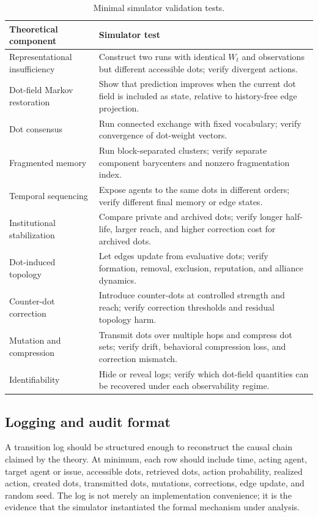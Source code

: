 \documentclass[11pt]{article}
\theoremstyle{remark}
\begin{document}
\begin{longtable}{L{0.31\textwidth}L{0.57\textwidth}}
\caption{Minimal simulator validation tests.}\label{tab:simulator-theorem-tests}\\
\toprule
Theoretical component & Simulator test \\
\midrule
Representational insufficiency & Construct two runs with identical
$W_t$ and observations but different accessible dots; verify divergent
actions. \\
Dot-field Markov restoration & Show that prediction improves when the
current dot field is included as state, relative to history-free edge
projection. \\
Dot consensus & Run connected exchange with fixed vocabulary; verify
convergence of dot-weight vectors. \\
Fragmented memory & Run block-separated clusters; verify separate
component barycenters and nonzero fragmentation index. \\
Temporal sequencing & Expose agents to the same dots in different
orders; verify different final memory or edge states. \\
Institutional stabilization & Compare private and archived dots; verify
longer half-life, larger reach, and higher correction cost for archived
dots. \\
Dot-induced topology & Let edges update from evaluative dots; verify
formation, removal, exclusion, reputation, and alliance dynamics. \\
Counter-dot correction & Introduce counter-dots at controlled strength
and reach; verify correction thresholds and residual topology harm. \\
Mutation and compression & Transmit dots over multiple hops and compress
dot sets; verify drift, behavioral compression loss, and correction
mismatch. \\
Identifiability & Hide or reveal logs; verify which dot-field quantities
can be recovered under each observability regime. \\
\bottomrule
\end{longtable}

\subsection{Logging and audit format}\label{logging-and-audit-format}

A transition log should be structured enough to reconstruct the causal chain claimed by the theory. At minimum, each row should include time, acting agent, target agent or issue, accessible dots, retrieved dots, action probability, realized action, created dots, transmitted dots, mutations, corrections, edge update, and random seed. The log is not merely an implementation convenience; it is the evidence that the simulator instantiated the formal mechanism under analysis.
\end{document}
